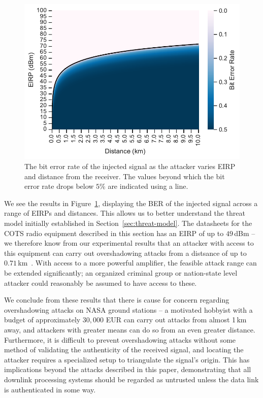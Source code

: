 \begin{figure}
    \centering
    \includegraphics[width=\columnwidth]{diagrams/distance_eirp_heatmap_95.pdf}
    \caption{The bit error rate of the injected signal as the attacker varies EIRP and distance from the receiver. The values beyond which the bit error rate drops below $5$\% are indicated using a line.}
    \label{fig:distance_eirp}
\end{figure}

We see the results in Figure~\ref{fig:distance_eirp}, displaying the BER of the injected signal across a range of EIRPs and distances.
This allows us to better understand the threat model initially established in Section~\ref{sec:threat-model}.
The datasheets for the COTS radio equipment described in this section has an EIRP of up to $49$\,dBm -- we therefore know from our experimental results that an attacker with access to this equipment can carry out overshadowing attacks from a distsance of up to $0.71$\,km~\cite{endurosat:xbandtransmitter,endurosat:xbandantenna}.
With access to a more powerful amplifier, the feasible attack range can be extended significantly; an organized criminal group or nation-state level attacker could reasonably be assumed to have access to these.

We conclude from these results that there is cause for concern regarding overshadowing attacks on NASA ground stations -- a motivated hobbyist with a budget of approximately $30,000$ EUR can carry out attacks from almost 1\,km away, and attackers with greater means can do so from an even greater distance.
Furthermore, it is difficult to prevent overshadowing attacks without some method of validating the authenticity of the received signal, and locating the attacker requires a specialized setup to triangulate the signal's origin.
This has implications beyond the attacks described in this paper, demonstrating that all downlink processing systems should be regarded as untrusted unless the data link is authenticated in some way.
